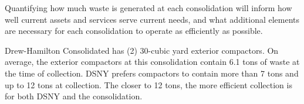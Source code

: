 
    Quantifying how much waste is generated at each consolidation will inform how well current assets and services serve current needs, and what additional elements are necessary for each consolidation to operate as efficiently as possible.
    
    Drew-Hamilton Consolidated has (2) 30-cubic yard exterior compactors. On average, the exterior compactors at this consolidation contain 6.1 tons of waste at the time of collection. DSNY prefers compactors to contain more than 7 tons and up to 12 tons at collection. The closer to 12 tons, the more efficient collection is for both DSNY and the consolidation.